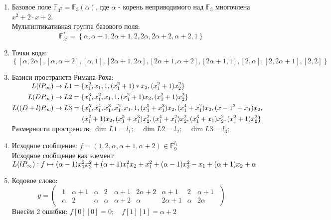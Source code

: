 \documentclass{article}
\def\F{\mathbb{F}}
\numberwithin{equation}{section}
\begin{document}
\begin{enumerate}
\item Базовое поле $ \F_{3^2} = \F_{3}(\alpha) $, где $ \alpha $  - корень неприводимого над $ \F_3 $ многочлена $ x^2 + 2 \cdot x + 2 $. \\
Мультиптикативная группа базового поля:
\[ 
	\F_{3^2}^{*} = \left\lbrace \alpha, \alpha + 1, 2\alpha + 1, 2, 2\alpha, 2\alpha + 2, \alpha + 2, 1 \right\rbrace
\]
\item Точки кода:
\[
	\left\lbrace [\alpha, 2\alpha], [\alpha, \alpha + 2], [\alpha, 1], [2\alpha + 1, 2\alpha], [2\alpha + 1, \alpha + 2], [2\alpha + 1, 1], [2, \alpha], [2, 2\alpha + 1], [2, 2] \right\rbrace 
\]
\item Базиси пространств Римана-Роха: \\
	$
	\!
	\begin{aligned}[t]
		L(lP_{\infty}) \rightarrow L1 = \{ &x_1^2, x_1, 1, (x_1^2 + 1)*x_2, (x_1^2 + 1)x_2^2 \} \\
		L(DP_{\infty}) \rightarrow L2 = \{ &x_1^3, x_1^2, x_1, 1, (x_1^2 + 1)x_2, (x_1^2 + 1)x_2^2 \} \\
		L((D+l)P_{\infty}) \rightarrow L3 = \{ &x_1^5, x_1^4, x_1^3, x_1^2, x_1, 1, (x_1^5 + x_1^3)x_2, (x_1^4 + x_1^2)x_2, (x-1^3 + x_1)x_2, \\
		(&x_1^2 + 1)x_2, (x_1^5 + x_1^3)x_2^2, (x_1^4 + x_1^2)x_2^2, (x_1^3 + x_1)x_2^2, (x_1^2 + 1)x_2^2 \}
	\end{aligned} \\
	$ \\
	Размерности пространств: $ \dim{L1} = l_1; \quad \dim{L2} = l_2; \quad \dim{L3} = l_3; $
\item Исходное сообщение: $ f = (1, 2, \alpha, \alpha + 1, \alpha + 2) \in \F_9^{l_1} $ \\
	Исходное сообщение как элемент $ L(lP_{\infty}): \\ f \mapsto (\alpha - 1)x_1^2 x_2^2 + (\alpha + 1) x_1^2 x_2 + x_1^2 + (\alpha - 1) x_2^2 - x_1 + (\alpha + 1) x_2 + \alpha $
\item Кодовое слово:
\[
	y =
	\begin{pmatrix}
		\begin{matrix} 
			1 & \alpha + 1 & \alpha & 2 & \alpha + 1 & 2\alpha + 2 & \alpha + 1 & 2 & \alpha + 1 \\
			\alpha & 2 & \alpha & \alpha & \alpha + 2 & \alpha & 2\alpha + 1 & \alpha & 2\alpha
		\end{matrix}
	\end{pmatrix}
\]
	Внесём 2 ошибки: $ f[0][0] = 0; \quad f[1][1] = \alpha + 2 $ \\

\end{enumerate}
\end{document}
